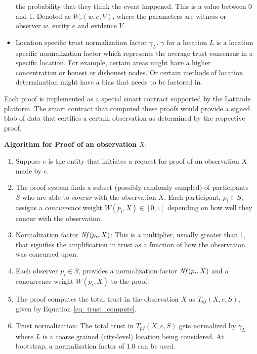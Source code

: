 \begin{itemize}
        the probability that they think the event happened. This is a value between 0 and 1. Denoted as $W_c(w, e, V)$,
        where the parameters are witness or observer $w$, entity $e$ and evidence $V$.
    \item Location specific trust normalization factor $\gamma_L$. $\gamma$ for a location $L$ is a location specific
        normalization factor which represents the average trust consensus in a specific location. For example, certain
        areas might have a higher concentration or honest or dishonest nodes. Or certain methods of location
        determination might have a bias that needs to be factored in.
\end{itemize}

Each proof is implemented as a special smart contract supported by the Latitude platform. The smart contract that
computed these proofs would provide a signed blob of data that certifies a certain observation as determined by the
respective proof.

\noindent
{\bf Algorithm for Proof of an observation $X$}:
\begin{enumerate}
    \item Suppose $e$ is the entity that initiates a request for proof of an observation $X$ made by $e$.
    \item The proof system finds a subset (possibly randomly sampled) of participants $S$ who are able
        to {\it concur} with the observation $X$. Each participant, $p_i \in S$, assigns a {\em concurrence} weight
        $W(p_i, X) \in [0,1]$ depending on how well they concur with the observation.
    \item Normalization factor $\mathit{Nf}(p_i, X)$: This is a multiplier, usually greater than 1, that signifies the
        amplification in trust as a function of how the observation was concurred upon. 
    \item Each observer $p_i \in S$, provides a normalization factor $\mathit{Nf}(p_i, X)$ and a concurrence weight $W(p_i, X)$
        to the proof.
    \item The proof computes the total trust in the observation $X$ as $T_{pf}(X, e, S)$, given by Equation
        \ref{eq_trust_compute}.
    \item Trust normalization: The total trust in $T_{pf}(X, e, S)$ gets normalized by $\gamma_L$ where $L$ is a coarse
        grained (city-level) location being considered. At bootstrap, a normalization factor of $1.0$ can be used.
\end{enumerate}

